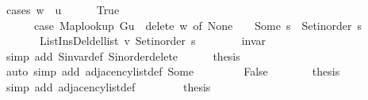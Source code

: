 \begin{isabellebody}
\ {\isacharparenleft}{\kern0pt}cases\ {\isachardoublequoteopen}w\ {\isacharequal}{\kern0pt}\ {\isacharquery}{\kern0pt}u{\isachardoublequoteclose}{\isacharparenright}{\kern0pt}\isanewline
\ \ \ \ \isamarkupfalse%
\ True\isanewline
\ \ \ \ \isamarkupfalse%
\isanewline
\ \ \ \ \ \ {\isachardoublequoteopen}{\isacharparenleft}{\kern0pt}case\ {\isacharparenleft}{\kern0pt}Map{\isacharunderscore}{\kern0pt}lookup\ G{\isacharparenleft}{\kern0pt}{\isacharquery}{\kern0pt}u\ {\isasymmapsto}\ {\isacharquery}{\kern0pt}delete{\isacharparenright}{\kern0pt}{\isacharparenright}{\kern0pt}\ w\ of\ None\ {\isasymRightarrow}\ {\isacharbrackleft}{\kern0pt}{\isacharbrackright}{\kern0pt}\ {\isacharbar}{\kern0pt}\ Some\ s\ {\isasymRightarrow}\ Set{\isacharunderscore}{\kern0pt}inorder\ s{\isacharparenright}{\kern0pt}\ {\isacharequal}{\kern0pt}\isanewline
\ \ \ \ \ \ \ List{\isacharunderscore}{\kern0pt}Ins{\isacharunderscore}{\kern0pt}Del{\isachardot}{\kern0pt}del{\isacharunderscore}{\kern0pt}list\ {\isacharquery}{\kern0pt}v\ {\isacharparenleft}{\kern0pt}Set{\isacharunderscore}{\kern0pt}inorder\ s{\isacharparenright}{\kern0pt}{\isachardoublequoteclose}\isanewline
\ \ \ \ \ \ \isamarkupfalse%
\ invar\isanewline
\ \ \ \ \ \ \isamarkupfalse%
\ {\isacharparenleft}{\kern0pt}simp\ add{\isacharcolon}{\kern0pt}\ S{\isachardot}{\kern0pt}invar{\isacharunderscore}{\kern0pt}def\ S{\isachardot}{\kern0pt}inorder{\isacharunderscore}{\kern0pt}delete{\isacharparenright}{\kern0pt}\isanewline
\ \ \ \ \isamarkupfalse%
\ {\isacharquery}{\kern0pt}thesis\isanewline
\ \ \ \ \ \ \isamarkupfalse%
\ {\isacharparenleft}{\kern0pt}auto\ simp\ add{\isacharcolon}{\kern0pt}\ adjacency{\isacharunderscore}{\kern0pt}list{\isacharunderscore}{\kern0pt}def\ Some{\isacharparenright}{\kern0pt}\isanewline
\ \ \isamarkupfalse%
\isanewline
\ \ \ \ \isamarkupfalse%
\ False\isanewline
\ \ \ \ \isamarkupfalse%
\ \isamarkupfalse%
\ {\isacharquery}{\kern0pt}thesis\isanewline
\ \ \ \ \ \ \isamarkupfalse%
\ {\isacharparenleft}{\kern0pt}simp\ add{\isacharcolon}{\kern0pt}\ adjacency{\isacharunderscore}{\kern0pt}list{\isacharunderscore}{\kern0pt}def{\isacharparenright}{\kern0pt}\isanewline
\ \ \isamarkupfalse%
\isanewline
\ \ \isamarkupfalse%
\ \isamarkupfalse%
\ {\isacharquery}{\kern0pt}thesis\isanewline
\ \ \ \ \isacommand{{\isachardot}{\kern0pt}}\isamarkupfalse%
\isanewline
{}\isamarkupfalse%

\end{isabellebody}
